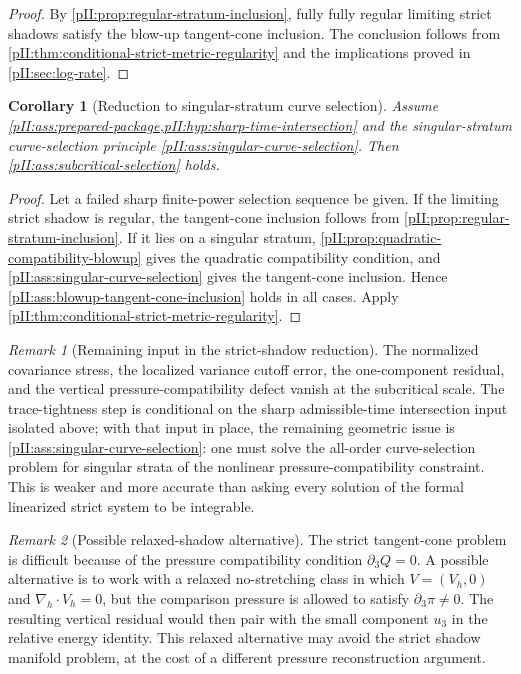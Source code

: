 \documentclass[11pt]{article}
\numberwithin{equation}{section}
\theoremstyle{plain}
\newtheorem{corollary}{Corollary}[section]
\theoremstyle{definition}
\theoremstyle{remark}
\newtheorem{remark}{Remark}[section]
\begin{document}
\begin{proof}
By \cref{pII:prop:regular-stratum-inclusion}, fully fully regular limiting strict shadows satisfy the blow-up tangent-cone inclusion.  The conclusion follows from \cref{pII:thm:conditional-strict-metric-regularity} and the implications proved in \cref{pII:sec:log-rate}.
\end{proof}

\begin{corollary}[Reduction to singular-stratum curve selection]\label{pII:cor:singular-curve-selection-reduction}
Assume \cref{pII:ass:prepared-package,pII:hyp:sharp-time-intersection} and the singular-stratum curve-selection principle \cref{pII:ass:singular-curve-selection}.  Then \cref{pII:ass:subcritical-selection} holds.
\end{corollary}

\begin{proof}
Let a failed sharp finite-power selection sequence be given.  If the limiting strict shadow is regular, the tangent-cone inclusion follows from \cref{pII:prop:regular-stratum-inclusion}.  If it lies on a singular stratum, \cref{pII:prop:quadratic-compatibility-blowup} gives the quadratic compatibility condition, and \cref{pII:ass:singular-curve-selection} gives the tangent-cone inclusion.  Hence \cref{pII:ass:blowup-tangent-cone-inclusion} holds in all cases.  Apply \cref{pII:thm:conditional-strict-metric-regularity}.
\end{proof}

\begin{remark}[Remaining input in the strict-shadow reduction]\label{pII:rem:strict-shadow-remaining}
The normalized covariance stress, the localized variance cutoff error, the one-component residual, and the vertical pressure-compatibility defect vanish at the subcritical scale.  The trace-tightness step is conditional on the sharp admissible-time intersection input isolated above; with that input in place, the remaining geometric issue is \cref{pII:ass:singular-curve-selection}: one must solve the all-order curve-selection problem for singular strata of the nonlinear pressure-compatibility constraint.  This is weaker and more accurate than asking every solution of the formal linearized strict system to be integrable.
\end{remark}

\begin{remark}[Possible relaxed-shadow alternative]\label{pII:rem:relaxed-shadow-alternative}
The strict tangent-cone problem is difficult because of the pressure compatibility condition $\partial_3Q=0$.  A possible alternative is to work with a relaxed no-stretching class in which $V=(V_h,0)$ and $\nabla_h\cdot V_h=0$, but the comparison pressure is allowed to satisfy $\partial_3\pi\ne0$.  The resulting vertical residual would then pair with the small component $u_3$ in the relative energy identity.  This relaxed alternative may avoid the strict shadow manifold problem, at the cost of a different pressure reconstruction argument.
\end{remark}
\end{document}

